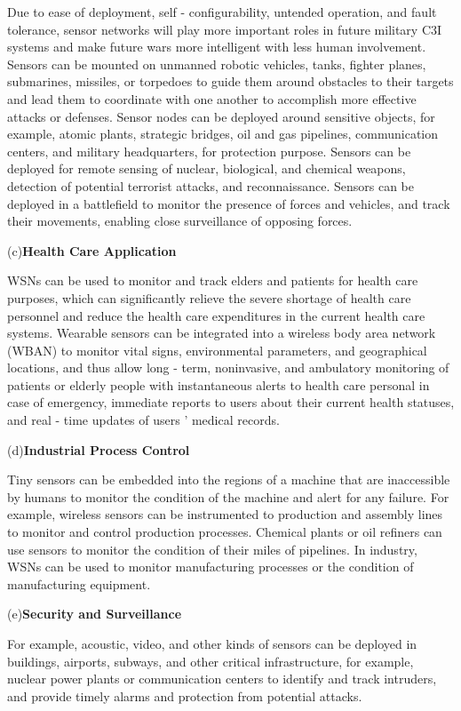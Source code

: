 Due to ease of deployment, self - configurability, untended operation, and fault tolerance, sensor networks will play more important roles in future military C3I systems and make future wars more intelligent with less human involvement. Sensors can be mounted on unmanned robotic vehicles, tanks, fighter planes, submarines, missiles, or torpedoes to guide them around obstacles to their targets and lead them to coordinate with one another to accomplish more effective attacks or defenses. Sensor nodes can be deployed around sensitive objects, for example, atomic plants, strategic bridges, oil and gas pipelines, communication centers, and military headquarters, for protection purpose. Sensors can be deployed for remote sensing of nuclear, biological, and chemical weapons, detection of potential terrorist attacks, and reconnaissance. Sensors can be deployed in a battlefield to monitor the presence of forces and vehicles, and track their movements, enabling close surveillance of opposing forces.

 (c)\textbf{Health Care Application}


WSNs can be used to monitor and track elders and patients for health care purposes, which can significantly relieve the severe shortage of health care personnel and reduce the health care expenditures in the current health care systems. Wearable sensors can be integrated into a wireless body area network (WBAN) to monitor vital signs, environmental parameters, and geographical locations, and thus allow long - term, noninvasive, and ambulatory monitoring of patients or elderly people with instantaneous alerts to health care personal in case of emergency, immediate reports to users about their current health statuses, and real - time updates of users ’ medical records.


 (d)\textbf{Industrial Process Control}


Tiny sensors can be embedded into the regions of a machine that are inaccessible by humans to monitor the condition of the machine and alert for any failure. For example, wireless sensors can be instrumented to production and assembly lines to monitor and control production processes. Chemical plants or oil refiners can use sensors to monitor the condition of their miles of pipelines. In industry, WSNs can be used to monitor manufacturing processes or the condition of manufacturing equipment.


 (e)\textbf{Security and Surveillance}


For example, acoustic, video, and other kinds of sensors can be deployed in buildings, airports, subways, and other critical infrastructure, for example, nuclear power plants or communication centers to identify and track intruders, and provide timely alarms and protection from potential attacks.


